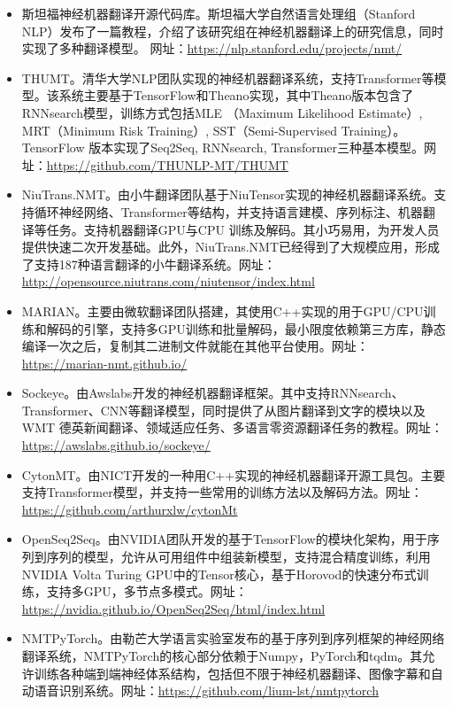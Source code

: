 \begin{itemize}
\item 斯坦福神经机器翻译开源代码库。斯坦福大学自然语言处理组（Stanford NLP）发布了一篇教程，介绍了该研究组在神经机器翻译上的研究信息，同时实现了多种翻译模型\cite{luong2016acl_hybrid}。 网址：\url{https://nlp.stanford.edu/projects/nmt/}
\vspace{0.5em}
\item THUMT。清华大学NLP团队实现的神经机器翻译系统，支持Transformer等模型\cite{ZhangTHUMT}。该系统主要基于TensorFlow和Theano实现，其中Theano版本包含了RNNsearch模型，训练方式包括MLE （Maximum Likelihood Estimate）, MRT（Minimum Risk Training）, SST（Semi-Supervised Training）。TensorFlow 版本实现了Seq2Seq, RNNsearch, Transformer三种基本模型。网址：\url{https://github.com/THUNLP-MT/THUMT}
\vspace{0.5em}
\item NiuTrans.NMT。由小牛翻译团队基于NiuTensor实现的神经机器翻译系统。支持循环神经网络、Transformer等结构，并支持语言建模、序列标注、机器翻译等任务。支持机器翻译GPU与CPU 训练及解码。其小巧易用，为开发人员提供快速二次开发基础。此外，NiuTrans.NMT已经得到了大规模应用，形成了支持187种语言翻译的小牛翻译系统。网址：\url{http://opensource.niutrans.com/niutensor/index.html}
\vspace{0.5em}
\item MARIAN。主要由微软翻译团队搭建\cite{JunczysMarian}，其使用C++实现的用于GPU/CPU训练和解码的引擎，支持多GPU训练和批量解码，最小限度依赖第三方库，静态编译一次之后，复制其二进制文件就能在其他平台使用。网址：\url{https://marian-nmt.github.io/}
\vspace{0.5em}
\item Sockeye。由Awslabs开发的神经机器翻译框架\cite{hieber2017sockeye}。其中支持RNNsearch、Transformer、CNN等翻译模型，同时提供了从图片翻译到文字的模块以及WMT 德英新闻翻译、领域适应任务、多语言零资源翻译任务的教程。网址：\url{https://awslabs.github.io/sockeye/}
\vspace{0.5em}
\item CytonMT。由NICT开发的一种用C++实现的神经机器翻译开源工具包\cite{WangCytonMT}。主要支持Transformer模型，并支持一些常用的训练方法以及解码方法。网址：\url{https://github.com/arthurxlw/cytonMt}
\vspace{0.5em}
\item OpenSeq2Seq。由NVIDIA团队开发的\cite{DBLP:journals/corr/abs-1805-10387}基于TensorFlow的模块化架构，用于序列到序列的模型，允许从可用组件中组装新模型，支持混合精度训练，利用NVIDIA Volta Turing GPU中的Tensor核心，基于Horovod的快速分布式训练，支持多GPU，多节点多模式。网址：\url{https://nvidia.github.io/OpenSeq2Seq/html/index.html}
\vspace{0.5em}
\item NMTPyTorch。由勒芒大学语言实验室发布的基于序列到序列框架的神经网络翻译系统\cite{nmtpy2017}，NMTPyTorch的核心部分依赖于Numpy，PyTorch和tqdm。其允许训练各种端到端神经体系结构，包括但不限于神经机器翻译、图像字幕和自动语音识别系统。网址：\url{https://github.com/lium-lst/nmtpytorch}
\vspace{0.5em}
\end{itemize}


